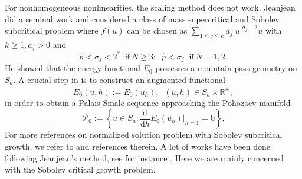 \documentclass[10pt]{article}
\numberwithin{equation}{section}
\newcommand{\ud}{\mathrm{d}}
\numberwithin{equation}{section}
\begin{document}
For nonhomogeneous nonlinearities, the scaling method does not work. Jeanjean  \cite{Jeanjean97} did a seminal work and considered a class of mass supercritical and Sobolev subcritical problem where $f(u)$ can be chosen as $\sum_{1\leq j \leq k}a_j|u|^{\sigma_j-2}u$ with $k\ge 1, a_j>0$ and
\[
\hat{p}<\sigma_j<2^* \;\;\text{if}~N\ge 3;\;\;\hat{p}<\sigma_j \;\;\text{if}~N=1, 2.
\]
He showed that the energy functional $E_0$ possesses a mountain pass geometry on $S_a$. A crucial step in \cite{Jeanjean97} is to construct an augmented functional
$$\widetilde{E_0}(u, h):=E_0(u_h), \;\; (u, h)\in S_a\times \mathbb{R}^+,$$
in order to obtain a Palais-Smale sequence approaching the Pohozaev manifold
\[
\mathcal{P}_0:=\left\{u\in S_a: \frac{\ud}{\ud h}E_0(u_h)\Big|_{h=1}=0 \right\}.
\]
For more references on normalized solution problem with Sobolev subcritical growth, we refer to \cite{Soave20_JDE, JL2020} and references therein. A lot of works have been done following Jeanjean's method, see for instance  \cite{BMRV2021, MRV2022, JL2020, Soave20_JFA, Soave20_JDE}. Here we are mainly concerned with the Sobolev critical growth problem.
\end{document}
